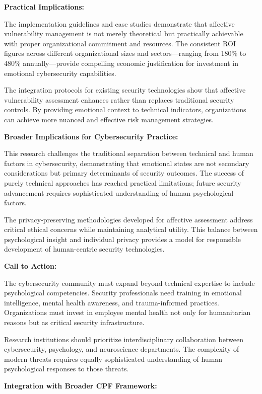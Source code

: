 \documentclass[11pt,a4paper]{article}
\begin{document}
\textbf{Practical Implications:}

The implementation guidelines and case studies demonstrate that affective vulnerability management is not merely theoretical but practically achievable with proper organizational commitment and resources. The consistent ROI figures across different organizational sizes and sectors—ranging from 180\% to 480\% annually—provide compelling economic justification for investment in emotional cybersecurity capabilities.

The integration protocols for existing security technologies show that affective vulnerability assessment enhances rather than replaces traditional security controls. By providing emotional context to technical indicators, organizations can achieve more nuanced and effective risk management strategies.

\textbf{Broader Implications for Cybersecurity Practice:}

This research challenges the traditional separation between technical and human factors in cybersecurity, demonstrating that emotional states are not secondary considerations but primary determinants of security outcomes. The success of purely technical approaches has reached practical limitations; future security advancement requires sophisticated understanding of human psychological factors.

The privacy-preserving methodologies developed for affective assessment address critical ethical concerns while maintaining analytical utility. This balance between psychological insight and individual privacy provides a model for responsible development of human-centric security technologies.

\textbf{Call to Action:}

The cybersecurity community must expand beyond technical expertise to include psychological competencies. Security professionals need training in emotional intelligence, mental health awareness, and trauma-informed practices. Organizations must invest in employee mental health not only for humanitarian reasons but as critical security infrastructure.

Research institutions should prioritize interdisciplinary collaboration between cybersecurity, psychology, and neuroscience departments. The complexity of modern threats requires equally sophisticated understanding of human psychological responses to those threats.

\textbf{Integration with Broader CPF Framework:}
\end{document}
